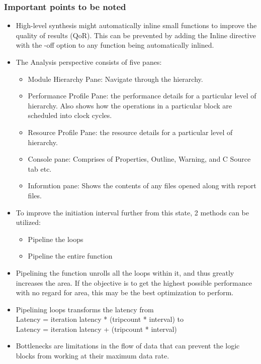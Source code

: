 \subsubsection{Important points to be noted}
\begin{itemize}
    \item High-level synthesis might automatically inline small functions to improve the quality of results (QoR). This can be prevented by adding the Inline directive with the -off option to any function being automatically inlined.
    \item The Analysis perspective consists of five panes: 
    \begin{itemize}
        \item Module Hierarchy Pane: Navigate through the hierarchy.
        \item Performance Profile Pane: the performance details for a particular level of hierarchy. Also shows how the operations in a particular block are scheduled into clock cycles.
        \item Resource Profile Pane: the resource details for a particular level of hierarchy.
        \item Console pane: Comprises of Properties, Outline, Warning, and C Source tab etc.
        \item Informtion pane: Shows the contents of any files opened along with report files.
    \end{itemize}
    \item To improve the initiation interval further from this state, 2 methods can be utilized:  
    \begin{itemize}
        \item Pipeline the loops
        \item Pipeline the entire function
    \end{itemize}
    \item Pipelining the function unrolls all the loops within it, and thus greatly increases the area. If the objective is to get the highest possible performance with no regard for area, this may be
    the best optimization to perform.
    \item Pipelining loops transforms the latency from\\
    Latency = iteration latency * (tripcount * interval)
    to\\
    Latency = iteration latency + (tripcount * interval)
    \item Bottlenecks are limitations in the flow of data that can
    prevent the logic blocks from working at their maximum data rate.

\end{itemize}
